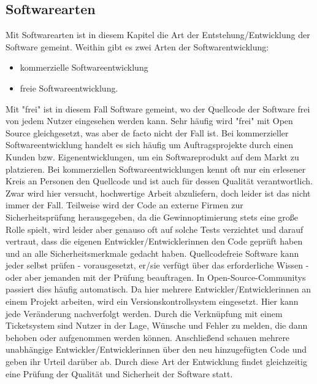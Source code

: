 \subsection{Softwarearten}
Mit Softwarearten ist in diesem Kapitel die Art der Entstehung/Entwicklung
der Software gemeint.
Weithin gibt es zwei Arten der Softwarentwicklung:
\begin{itemize}
  \item kommerzielle Softwareentwicklung
  \item freie Softwareentwicklung.
\end{itemize}
Mit "frei" ist in diesem Fall Software gemeint, wo der Quellcode der
Software frei von jedem Nutzer eingesehen werden kann. Sehr häufig wird
"frei" mit Open Source gleichgesetzt, was aber de facto nicht der Fall ist.
Bei kommerzieller Softwareentwicklung handelt es sich häufig um 
Auftragsprojekte durch einen Kunden bzw. Eigenentwicklungen, um ein
Softwareprodukt auf dem Markt zu platzieren.
Bei kommerziellen Softwareentwicklungen kennt oft nur ein erlesener Kreis
an Personen den Quellcode und ist auch für dessen Qualität verantwortlich.
Zwar wird hier versucht, hochwertige Arbeit abzuliefern, doch leider
ist das nicht immer der Fall. Teilweise wird der Code an externe
Firmen zur Sicherheitsprüfung herausgegeben, da die Gewinnoptimierung 
stets eine große Rolle spielt, wird leider aber genauso oft auf solche Tests
verzichtet und darauf vertraut, dass die eigenen Entwickler/Entwicklerinnen
den Code geprüft haben und an alle Sicherheitsmerkmale gedacht haben.
Quellcodefreie Software kann jeder selbst prüfen - vorausgesetzt, er/sie verfügt über 
das erforderliche Wissen - oder aber jemanden mit der Prüfung beauftragen.
In Open-Source-Communitys passiert dies häufig automatisch. Da hier 
mehrere Entwickler/Entwicklerinnen an einem Projekt arbeiten, wird ein
Versionskontrollsystem eingesetzt. Hier kann jede Veränderung nachverfolgt 
werden. Durch die Verknüpfung mit einem Ticketsystem sind Nutzer in der 
Lage, Wünsche und Fehler zu melden, die dann behoben oder
aufgenommen werden können. Anschließend schauen mehrere unabhängige 
Entwickler/Entwicklerinnen über den neu hinzugefügten Code und geben
ihr Urteil darüber ab. 
Durch diese Art der Entwicklung findet gleichzeitig eine Prüfung der
Qualität und Sicherheit der Software statt.  

\newpage
